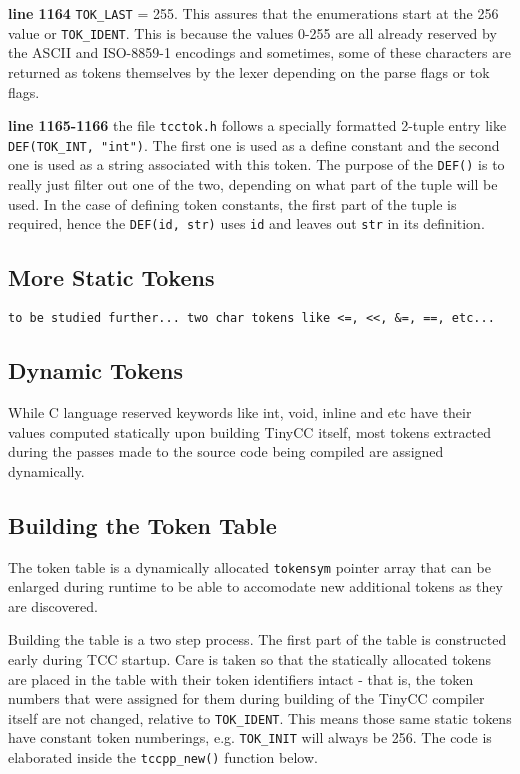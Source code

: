 \begin{tcc_desc}
\textbf{line 1164} \verb|TOK_LAST| = 255. This assures that the enumerations start at the 256 value or \verb|TOK_IDENT|. This is because the values 0-255 are all already reserved by the ASCII and ISO-8859-1 encodings and sometimes, some of these characters are returned as tokens themselves by the lexer depending on the parse flags or tok flags.

\textbf{line 1165-1166} the file \verb|tcctok.h| follows a specially formatted 2-tuple entry like \verb|DEF(TOK_INT, "int")|. The first one is used as a define constant and the second one is used as a string associated with this token. The purpose of the \verb|DEF()| is to really just filter out one of the two, depending on what part of the tuple will be used. In the case of defining token constants, the first part of the tuple is required, hence the \verb|DEF(id, str)| uses \verb|id| and leaves out \verb|str| in its definition.
\end{tcc_desc}

\subsection{More Static Tokens}

\begin{verbatim}
to be studied further... two char tokens like <=, <<, &=, ==, etc...
\end{verbatim}


\subsection{Dynamic Tokens}

While C language reserved keywords like int, void, inline and etc have their values computed statically upon building TinyCC itself, most tokens extracted during the passes made to the source code being compiled are assigned dynamically.


\subsection{Building the Token Table}

The token table is a dynamically allocated \verb|tokensym| pointer array that can be enlarged during runtime to be able to accomodate new additional tokens as they are discovered. 

Building the table is a two step process. The first part of the table is constructed early during TCC startup. Care is taken so that the statically allocated tokens are placed in the table with their token identifiers intact - that is, the token numbers that were assigned for them during building of the TinyCC compiler itself are not changed, relative to \verb|TOK_IDENT|. This means those same static tokens have constant token numberings, e.g. \verb|TOK_INIT| will always be 256. The code is elaborated inside the \verb|tccpp_new()| function below.

